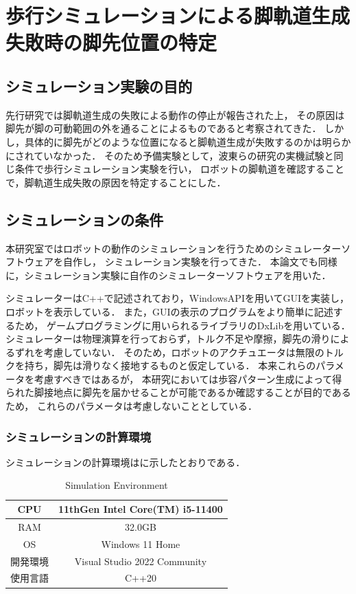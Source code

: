 \section{歩行シミュレーションによる脚軌道生成失敗時の脚先位置の特定}

\subsection{シミュレーション実験の目的}
先行研究では脚軌道生成の失敗による動作の停止が報告された上，
その原因は脚先が脚の可動範囲の外を通ることによるものであると考察されてきた．
しかし，具体的に脚先がどのような位置になると脚軌道生成が失敗するのかは明らかにされていなかった．
そのため予備実験として，波東らの研究\cite{Hato_Graph_search}の実機試験と同じ条件で歩行シミュレーション実験を行い，
ロボットの脚軌道を確認することで，脚軌道生成失敗の原因を特定することにした．

\subsection{シミュレーションの条件}
本研究室ではロボットの動作のシミュレーションを行うためのシミュレーターソフトウェアを自作し，
シミュレーション実験を行ってきた．
本論文でも同様に，シミュレーション実験に自作のシミュレーターソフトウェアを用いた．

シミュレーターはC++で記述されており，WindowsAPIを用いてGUIを実装し，ロボットを表示している．
また，GUIの表示のプログラムをより簡単に記述するため，
ゲームプログラミングに用いられるライブラリのDxLib\cite{Dxlib_Web}を用いている．
シミュレーターは物理演算を行っておらず，トルク不足や摩擦，脚先の滑りによるずれを考慮していない．
そのため，ロボットのアクチュエータは無限のトルクを持ち，脚先は滑りなく接地するものと仮定している．
本来これらのパラメータを考慮すべきではあるが，
本研究においては歩容パターン生成によって得られた脚接地点に脚先を届かせることが可能であるか確認することが目的であるため，
これらのパラメータは考慮しないこととしている．

\subsubsection{シミュレーションの計算環境}
シミュレーションの計算環境はに示したとおりである．

\begin{table}[htbp]
	\caption{Simulation Environment}
	\label{tab:simulation_env}
	\begin{center}
   	\begin{tabular}{|c||c|} \hline
      CPU & 11thGen Intel Core(TM) i5-11400  \\ \hline
      RAM & 32.0GB  \\ \hline
      OS & Windows 11 Home  \\ \hline
      開発環境 & Visual Studio 2022 Community  \\ \hline
      使用言語 & C++20  \\ \hline
    \end{tabular}
  \end{center}
\end{table}

